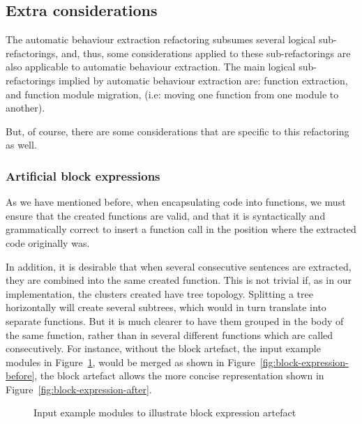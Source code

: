 \subsection{Extra considerations}

The automatic behaviour extraction refactoring subsumes several logical
sub-refactorings, and, thus, some considerations applied to these 
sub-refactorings
are also applicable to automatic behaviour extraction. The main logical
sub-refactorings implied by automatic behaviour extraction are: function
extraction, and function module migration, (i.e: moving one function
from one module to another).

But, of course, there are some considerations that are specific to
this refactoring as well.

\subsubsection{Artificial block 
expressions\label{sub:artificial-block-expressions}}

As we have mentioned before, when encapsulating code into functions,
we must ensure that the created functions are valid, and that it is
syntactically and grammatically correct to insert a function call
in the position where the extracted code originally was.

In addition, it is desirable that when several consecutive sentences
are extracted, they are combined into the same created function. This
is not trivial if, as in our implementation, the clusters created
have tree topology. Splitting a tree horizontally will create several
subtrees, which would in turn translate into separate functions. But
it is much clearer to have them grouped in the body of the same function,
rather than in several different functions which are called consecutively.
For instance, without the block artefact, the input example modules in 
Figure~\ref{fig:block-expression-input},
would be merged as shown in Figure~\ref{fig:block-expression-before},
the block artefact allows the more concise representation shown in
Figure~\ref{fig:block-expression-after}.

\begin{figure}
\begin{minipage}[t]{0.5\textwidth}%
\end{minipage}%
\begin{minipage}[t]{0.5\textwidth}%
\end{minipage}

\caption{Input example modules to illustrate block expression 
artefact\label{fig:block-expression-input}}

\end{figure}

